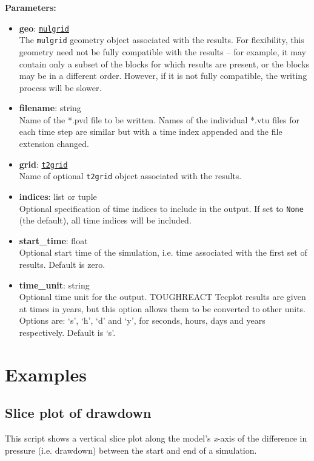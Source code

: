 \textbf{Parameters:}
\begin{itemize}
\item \textbf{geo}: \hyperref[mulgrids]{\texttt{mulgrid}}\\
  The \texttt{mulgrid} geometry object associated with the results.  For flexibility, this geometry need not be fully compatible with the results -- for example, it may contain only a subset of the blocks for which results are present, or the blocks may be in a different order.  However, if it is not fully compatible, the writing process will be slower.
\item \textbf{filename}: string\\
  Name of the *.pvd file to be written.  Names of the individual *.vtu files for each time step are similar but with a time index appended and the file extension changed.
\item \textbf{grid}: \hyperref[t2grids]{\texttt{t2grid}}\\
  Name of optional \texttt{t2grid} object associated with the results.
\item \textbf{indices}: list or tuple\\
  Optional specification of time indices to include in the output.  If set to \texttt{None} (the default), all time indices will be included.
\item \textbf{start\_time}: float\\
  Optional start time of the simulation, i.e. time associated with the first set of results.  Default is zero.
\item \textbf{time\_unit}: string\\
  Optional time unit for the output.  TOUGHREACT Tecplot results are given at times in years, but this option allows them to be converted to other units.  Options are: `s', `h', `d' and `y', for seconds, hours, days and years respectively.  Default is `s'.
\end{itemize}

\section{Examples}

\subsection{Slice plot of drawdown}

This script shows a vertical slice plot along the model's \emph{x}-axis of the difference in pressure (i.e. drawdown) between the start and end of a simulation.

